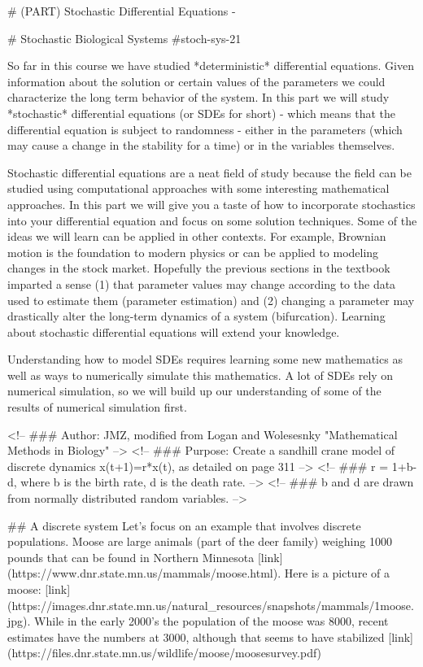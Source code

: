 \documentclass[
]{book}
\theoremstyle{definition}
\theoremstyle{definition}
\theoremstyle{definition}
\theoremstyle{remark}
\begin{document}
# (PART) Stochastic Differential Equations {-} 

# Stochastic Biological Systems {#stoch-sys-21}

So far in this course we have studied *deterministic* differential equations.  Given information about the solution or certain values of the parameters we could characterize the long term behavior of the system.  In this part we will study *stochastic* differential equations (or SDEs for short) - which means that the differential equation is subject to randomness - either in the parameters (which may cause a change in the stability for a time) or in the variables themselves.

Stochastic differential equations are a neat field of study because the field can be studied using computational approaches with some interesting mathematical approaches. In this part we will give you a taste of how to incorporate stochastics into your differential equation and focus on some solution techniques. Some of the ideas we will learn can be applied in other contexts.  For example, Brownian motion is the foundation to modern physics or can be applied to modeling changes in the stock market.  
Hopefully the previous sections in the textbook imparted a sense (1) that parameter values may change according to the data used to estimate them (parameter estimation) and (2) changing a parameter may drastically alter the long-term dynamics of a system (bifurcation). Learning about stochastic differential equations will extend your knowledge.

Understanding how to model SDEs requires learning some new mathematics as well as ways to numerically simulate this mathematics. A lot of SDEs rely on numerical simulation, so we will build up our understanding of some of the results of numerical simulation first.

<!-- ### Author: JMZ, modified from Logan and Wolesesnky "Mathematical Methods in Biology" -->
<!-- ### Purpose: Create a sandhill crane model of discrete dynamics x(t+1)=r*x(t), as detailed on page 311 -->
<!-- ### r = 1+b-d, where b is the birth rate, d is the death rate. -->
<!-- ### b and d are drawn from normally distributed random variables. -->

## A discrete system
Let's focus on an example that involves discrete populations. Moose are large animals (part of the deer family) weighing 1000 pounds that can be found in Northern Minnesota [link](https://www.dnr.state.mn.us/mammals/moose.html).  Here is a picture of a moose: [link](https://images.dnr.state.mn.us/natural_resources/snapshots/mammals/1moose.jpg).  While in the early 2000's the population of the moose was 8000, recent estimates have the numbers at 3000, although that seems to have stabilized [link](https://files.dnr.state.mn.us/wildlife/moose/moosesurvey.pdf)
\end{document}

